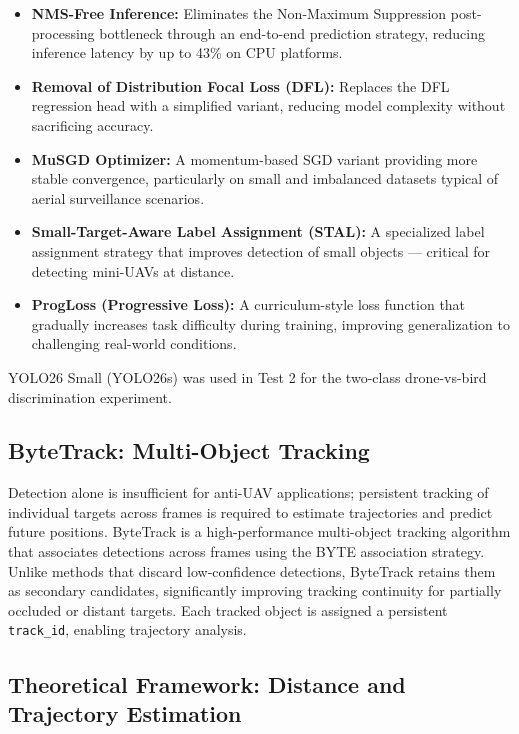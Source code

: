 \documentclass[12pt,a4paper]{report}
\begin{document}
\begin{itemize}
  \item \textbf{NMS-Free Inference:} Eliminates the Non-Maximum Suppression
  post-processing bottleneck through an end-to-end prediction strategy, reducing
  inference latency by up to 43\% on CPU platforms.

  \item \textbf{Removal of Distribution Focal Loss (DFL):} Replaces the DFL
  regression head with a simplified variant, reducing model complexity without
  sacrificing accuracy.

  \item \textbf{MuSGD Optimizer:} A momentum-based SGD variant providing more
  stable convergence, particularly on small and imbalanced datasets typical of
  aerial surveillance scenarios.

  \item \textbf{Small-Target-Aware Label Assignment (STAL):} A specialized label
  assignment strategy that improves detection of small objects — critical for
  detecting mini-UAVs at distance.

  \item \textbf{ProgLoss (Progressive Loss):} A curriculum-style loss function
  that gradually increases task difficulty during training, improving generalization
  to challenging real-world conditions.
\end{itemize}

YOLO26 Small (YOLO26s) was used in Test 2 for the two-class drone-vs-bird
discrimination experiment.

\subsection{ByteTrack: Multi-Object Tracking}

Detection alone is insufficient for anti-UAV applications; persistent tracking
of individual targets across frames is required to estimate trajectories and
predict future positions. ByteTrack \cite{zhang2022bytetrack} is a high-performance
multi-object tracking algorithm that associates detections across frames using
the BYTE association strategy. Unlike methods that discard low-confidence
detections, ByteTrack retains them as secondary candidates, significantly improving
tracking continuity for partially occluded or distant targets. Each tracked object
is assigned a persistent \texttt{track\_id}, enabling trajectory analysis.

\subsection{Theoretical Framework: Distance and Trajectory Estimation}
\end{document}
